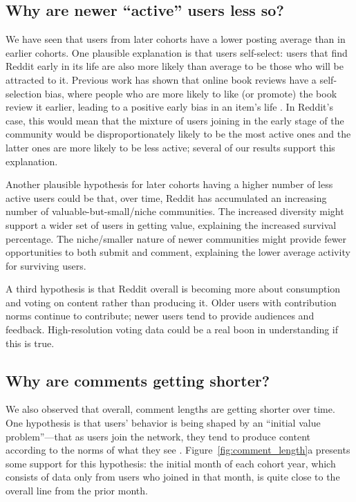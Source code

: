 \subsection{Why are newer ``active'' users less so?}

We have seen that users from later cohorts have a lower posting average than in earlier cohorts. 
One plausible explanation is that users self-select: users that find Reddit early in its life are also more likely than average to be those who will be attracted to it. Previous work has shown that online book reviews have a self-selection bias, where people who are more likely to like (or promote) the book review it earlier, leading to a positive early bias in an item's life \cite{Li2008}.  In Reddit's case, this would mean that the mixture of users joining in the early stage of the community would be disproportionately likely to be the most active ones and the latter ones are more likely to be less active; several of our results support this explanation.

Another plausible hypothesis for later cohorts having a higher number of less active users could be that, over time, Reddit has accumulated an increasing number of valuable-but-small/niche communities.  The increased diversity might support a wider set of users in getting value, explaining the increased survival percentage.  The niche/smaller nature of newer communities might provide fewer opportunities to both submit and comment, explaining the lower average activity for surviving users. 

A third hypothesis is that Reddit overall is becoming more about consumption and voting on content rather than producing it.  Older users with contribution norms continue to contribute; newer users tend to provide audiences and feedback.  High-resolution voting data could be a real boon in understanding if this is true.

\subsection{Why are comments getting shorter?}

We also observed that overall, comment lengths are getting shorter over time.  
One hypothesis is that users' behavior is being shaped by an ``initial value problem''---that as users join the network, they tend to produce content according to the norms of what they see \cite{Kooti2010, Danescu-niculescu-mizil2013}. 
Figure~\ref{fig:comment_length}a presents some support for this hypothesis: the initial month of each cohort year, which consists of data only from users who joined in that month, is quite close to the overall line from the prior month.  

